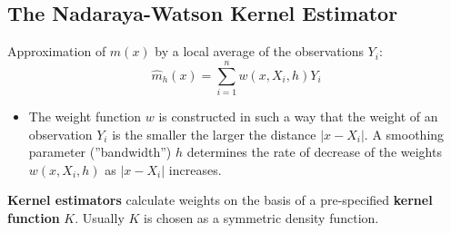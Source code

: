 \documentclass[14pt]{extreport}\usepackage[]{graphicx}\usepackage[]{xcolor}
\begin{document}
% 
% 
% 
% 
% 
% 
% 


\newpage

\subsection{The Nadaraya-Watson Kernel Estimator}

\bigbreak{} Approximation of $m(x)$ by a local average of the
 observations $Y_i$:
$${\hat m}_ h(x)=\sum_{i=1}^n w(x,X_i, h)Y_i$$
\begin{itemize}
\item The weight function
$w$ is constructed in such a way that the weight of an  observation $Y_i$ is the smaller the larger the distance
$|x-X_i|$. A smoothing parameter (''bandwidth'')
$h$ determines the rate of decrease of the weights $w(x,X_i, h)$ as
$|x-X_i|$ increases.
\end{itemize}
\par\noindent
\textbf{Kernel estimators} calculate weights on the basis of a pre-specified
\textbf{kernel function} $K$. Usually  $K$ is chosen as a symmetric density function.
 
\end{document}
